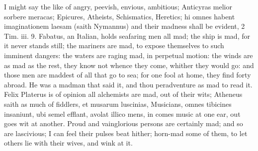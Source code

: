 {I might say the like of angry, peevish, envious, ambitious; 
Anticyras melior sorbere meracas; Epicures, Atheists, Schismatics,
Heretics; hi omnes habent imaginationem laesam (saith Nymannus) and
their madness shall be evident, 2 Tim. iii. 9. Fabatus, an
Italian, holds seafaring men all mad; the ship is mad, for it never
stands still; the mariners are mad, to expose themselves to such
imminent dangers: the waters are raging mad, in perpetual motion: the
winds are as mad as the rest, they know not whence they come, whither
they would go: and those men are maddest of all that go to sea; for one
fool at home, they find forty abroad. He was a madman that said it, and
thou peradventure as mad to read it.  Felix Platerus is of opinion
all alchemists are mad, out of their wits; Atheneus saith as much
of fiddlers, et musarum luscinias,  Musicians, omnes tibicines
insaniunt, ubi semel efflant, avolat illico mens, in comes music at one
ear, out goes wit at another. Proud and vainglorious persons are
certainly mad; and so are lascivious; I can feel their pulses beat
hither; horn-mad some of them, to let others lie with their wives, and
wink at it.

}
